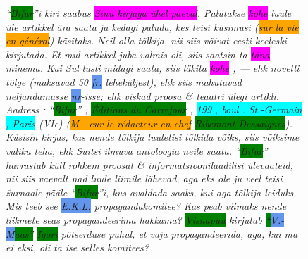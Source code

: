 \documentclass[runningheads]{llncs}
\begin{document}
\begin{figure}
  \centering
  \begin{minipage}{0.9\textwidth}
\itshape
  ``\colorbox{Green}{Bifur}''i kiri saabus \colorbox{Magenta}{Sinu kirjaga \"uhel p\"aeval}. Palutakse \colorbox{Magenta}{kohe} luule \"ule artikkel \"ara saata ja kedagi paluda, kes teisi k\"usimusi
  (\colorbox{Orange}{sur la vie en g\'en\'eral})
k\"asitaks. Neil olla t\~olkija, nii siis v\~oivat eesti keeleski kirjutada. Et mul artikkel juba valmis oli, siis saatsin ta \colorbox{Magenta}{t\"ana} minema. Kui Sul lusti midagi saata, siis l\"akita \colorbox{Magenta}{kohe} , --- ehk novelli t\~olge (maksavad 50 \colorbox{CornflowerBlue}{fr.} lehek\"uljest), ehk siis mahutavad neljandamasse \colorbox{CornflowerBlue}{nr}-isse; ehk viskad proosa \& teaatri \"ulegi artikli. Aadress : ``\colorbox{Green}{Bifur}'' , \colorbox{Green}{\'Editions du Carrefour} , \colorbox{Cyan}{199 , boul . St.-Germain , Paris} (VIe) (\colorbox{Orange}{M–--eur le r\'edacteur en chef}  \colorbox{Green}{Ribemont Dessaignes}). K\"usisin kirjas, kas nende t\~olkija luuletisi t\~olkida v\~oiks, siis v\~oiksime valiku teha, ehk Suitsi ilmuva antoloogia neile saata. ``\colorbox{Green}{Bifur}'' harrastab k\"ull rohkem proosat \& informatsioonilaadilisi \"ulevaateid, nii siis vaevalt nad luule liimile l\"ahevad, aga eks ole ju veel teisi \v{z}urnaale p\"a\"ale ``\colorbox{Green}{Bifur}''i, kus avaldada saaks, kui aga t\~olkija leiduks. Mis teeb see \colorbox{CornflowerBlue}{E.K.L.} propagandakomitee? Kas peab viimaks nende liikmete seas propagandeerima hakkama? \colorbox{Green}{Visnapuu} kirjutab \colorbox{Green}{``\colorbox{CornflowerBlue}{V.-M}aas''} \colorbox{Green}{Igori} p\"otserduse puhul, et vaja propagandeerida, aga, kui ma ei eksi, oli ta ise selles komitees?

  \end{minipage}
  
  \begin{minipage}{0.9\textwidth}
    \vspace{18pt}

\end{minipage}
\end{figure}
\end{document}
